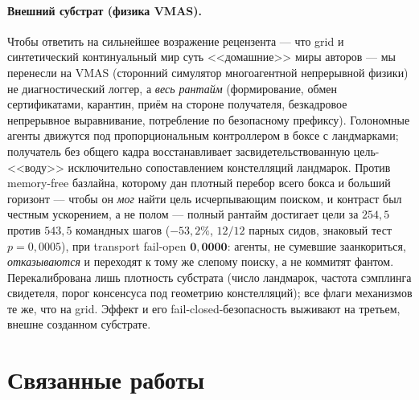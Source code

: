 \documentclass{article}
\begin{document}
\paragraph{Внешний субстрат (физика VMAS).}
Чтобы ответить на сильнейшее возражение рецензента --- что grid и
синтетический континуальный мир суть <<домашние>> миры авторов --- мы
перенесли на VMAS (сторонний симулятор многоагентной непрерывной
физики) не диагностический логгер, а \emph{весь рантайм}
(формирование, обмен сертификатами, карантин, приём на стороне
получателя, безкадровое непрерывное выравнивание, потребление по
безопасному префиксу). Голономные агенты движутся под
пропорциональным контроллером в боксе с ландмарками; получатель без
общего кадра восстанавливает засвидетельствованную цель-<<воду>>
исключительно сопоставлением констелляций ландмарок. Против
memory-free базлайна, которому дан плотный перебор всего бокса и
больший горизонт --- чтобы он \emph{мог} найти цель исчерпывающим
поиском, и контраст был честным ускорением, а не полом --- полный
рантайм достигает цели за $254{,}5$ против $543{,}5$ командных шагов
($-53{,}2\%$, $12/12$ парных сидов, знаковый тест $p=0{,}0005$), при
transport fail-open $\mathbf{0{,}0000}$: агенты, не сумевшие
заанкориться, \emph{отказываются} и переходят к тому же слепому
поиску, а не коммитят фантом. Перекалибрована лишь плотность субстрата
(число ландмарок, частота сэмплинга свидетеля, порог консенсуса под
геометрию констелляций); все флаги механизмов те же, что на grid.
Эффект и его fail-closed-безопасность выживают на третьем, внешне
созданном субстрате.

\section{Связанные работы}
\label{sec:related}
\end{document}
